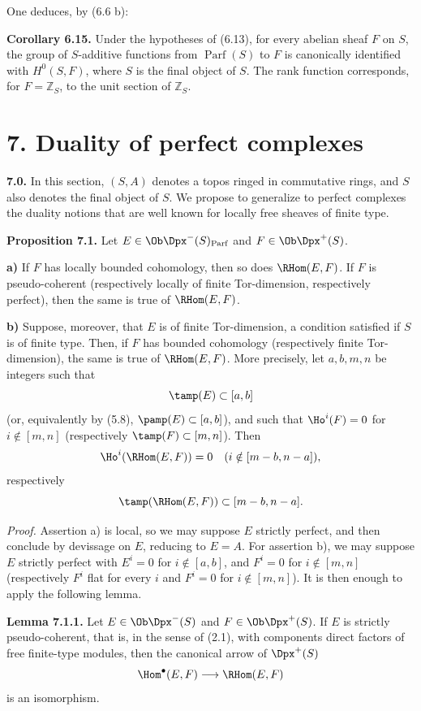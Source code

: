 \documentclass[11pt]{article}
\newcommand{\Parf}{\operatorname{Parf}}
\begin{document}
One deduces, by (6.6 b):

\textbf{Corollary 6.15.} Under the hypotheses of (6.13), for every abelian sheaf \(F\) on \(S\), the group of \(S\)-additive functions from \(\Parf(S)\) to \(F\) is canonically identified with \(H^0(S,F)\), where \(S\) is the final object of \(S\). The rank function corresponds, for \(F=\mathbb Z_S\), to the unit section of \(\mathbb Z_S\).

\section*{7. Duality of perfect complexes}

\textbf{7.0.} In this section, \((S,A)\) denotes a topos ringed in commutative rings, and \(S\) also denotes the final object of \(S\). We propose to generalize to perfect complexes the duality notions that are well known for locally free sheaves of finite type.

\textbf{Proposition 7.1.} Let \(E\in\Ob\Dpx^-(S)_{\Parf}\) and \(F\in\Ob\Dpx^+(S)\).

\textbf{a)} If \(F\) has locally bounded cohomology, then so does \(\RHom(E,F)\). If \(F\) is pseudo-coherent (respectively locally of finite Tor-dimension, respectively perfect), then the same is true of \(\RHom(E,F)\).

\textbf{b)} Suppose, moreover, that \(E\) is of finite Tor-dimension, a condition satisfied if \(S\) is of finite type. Then, if \(F\) has bounded cohomology (respectively finite Tor-dimension), the same is true of \(\RHom(E,F)\). More precisely, let \(a,b,m,n\) be integers such that
\[
  \tamp(E)\subset[a,b]
\]
(or, equivalently by (5.8), \(\pamp(E)\subset[a,b]\)), and such that \(\Ho^i(F)=0\) for \(i\notin[m,n]\) (respectively \(\tamp(F)\subset[m,n]\)). Then
\[
  \Ho^i(\RHom(E,F))=0\quad(i\notin[m-b,n-a]),
\]
respectively
\[
  \tamp(\RHom(E,F))\subset[m-b,n-a].
\]

\emph{Proof.} Assertion a) is local, so we may suppose \(E\) strictly perfect, and then conclude by devissage on \(E\), reducing to \(E=A\). For assertion b), we may suppose \(E\) strictly perfect with \(E^i=0\) for \(i\notin[a,b]\), and \(F^i=0\) for \(i\notin[m,n]\) (respectively \(F^i\) flat for every \(i\) and \(F^i=0\) for \(i\notin[m,n]\)). It is then enough to apply the following lemma.

\textbf{Lemma 7.1.1.} Let \(E\in\Ob\Dpx^-(S)\) and \(F\in\Ob\Dpx^+(S)\). If \(E\) is strictly pseudo-coherent, that is, in the sense of (2.1), with components direct factors of free finite-type modules, then the canonical arrow of \(\Dpx^+(S)\)
\[
  \Hom^\bullet(E,F)\longrightarrow \RHom(E,F)
\]
is an isomorphism.
\end{document}
